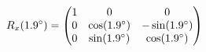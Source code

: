 \documentclass[preview]{standalone}
\begin{document}
\begin{align*}
\special{dvisvgm:raw <g id='unique000'>}R_x(1.9^\circ) = \begin{pmatrix} 1 & 0 & 0 \\ 0 & \cos(1.9^\circ) & -\sin(1.9^\circ) \\ 0 & \sin(1.9^\circ) & \cos(1.9^\circ) \end{pmatrix}\special{dvisvgm:raw </g>}
\end{align*}
\end{document}
